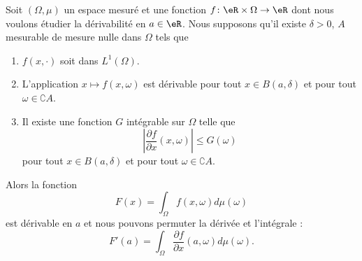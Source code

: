 \begin{theorem}    \label{ThoMWpRKYp}
    Soit \( (\Omega,\mu)\) un espace mesuré et une fonction \( f\colon \eR\times \Omega\to \eR\) dont nous voulons étudier la dérivabilité en \(a\in \eR\). Nous supposons qu'il existe \( \delta>0\), \( A\) mesurable de mesure nulle dans \( \Omega\) tels que
    \begin{enumerate}
        \item
            \( f(x,\cdot)\) soit dans \( L^1(\Omega)\).
        \item
            L'application \( x\mapsto f(x,\omega)\) est dérivable pour tout \( x\in B(a,\delta)\) et pour tout \( \omega\in \complement A\).
        \item
            Il existe une fonction \( G\) intégrable sur \( \Omega\) telle que
            \begin{equation}
                \left| \frac{ \partial f }{ \partial x }(x,\omega) \right| \leq G(\omega)
            \end{equation}
            pour tout \( x\in B(a,\delta)\) et pour tout \( \omega\in\complement A\).
    \end{enumerate}
    Alors la fonction
    \begin{equation}
        F(x)=\int_{\Omega}f(x,\omega)d\mu(\omega)
    \end{equation}
    est dérivable en \( a\) et nous pouvons permuter la dérivée et l'intégrale :
    \begin{equation}
        F'(a)=\int_{\Omega}\frac{ \partial f }{ \partial x }(a,\omega)d\mu(\omega).
    \end{equation}
\end{theorem}

